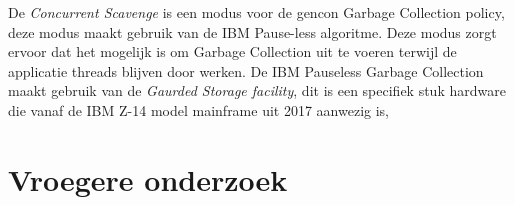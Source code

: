 De \textit{Concurrent Scavenge} is een modus voor de gencon Garbage Collection policy, deze modus maakt gebruik van de IBM Pause-less algoritme. Deze modus zorgt ervoor dat het mogelijk is om Garbage Collection uit te voeren terwijl de  applicatie threads blijven door werken.
De IBM Pauseless Garbage Collection maakt gebruik van de \textit{Gaurded Storage facility}, dit is een specifiek stuk hardware die vanaf de IBM Z-14 model mainframe uit 2017 aanwezig is,


\section{Vroegere onderzoek}
\label{sec:vroegereonderzoek}